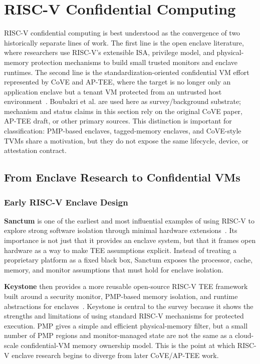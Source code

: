 \section{RISC-V Confidential Computing}

RISC-V confidential computing is best understood as the convergence of two
historically separate lines of work. The first line is the open enclave
literature, where researchers use RISC-V's extensible ISA, privilege model, and
physical-memory protection mechanisms to build small trusted monitors and
enclave runtimes. The second line is the standardization-oriented confidential
VM effort represented by CoVE and AP-TEE, where the target is no longer only an
application enclave but a tenant VM protected from an untrusted host
environment~\cite{sahita2023cove,riscv_ap_tee_2024,boubakri2025riscvtee}.
Boubakri et al. are used here as survey/background substrate; mechanism and
status claims in this section rely on the original CoVE paper, AP-TEE draft, or
other primary sources. This distinction is important for classification:
PMP-based enclaves, tagged-memory enclaves, and CoVE-style TVMs share a
motivation, but they do not expose the same lifecycle, device, or attestation
contract.

\subsection{From Enclave Research to Confidential VMs}

\subsubsection{Early RISC-V Enclave Design}

\textbf{Sanctum} is one of the earliest and most influential examples of using
RISC-V to explore strong software isolation through minimal hardware
extensions~\cite{costan2016sanctum}. Its importance is not just that it provides
an enclave system, but that it frames open hardware as a way to make TEE
assumptions explicit. Instead of treating a proprietary platform as a fixed
black box, Sanctum exposes the processor, cache, memory, and monitor assumptions
that must hold for enclave isolation.

\textbf{Keystone} then provides a more reusable open-source RISC-V TEE
framework built around a security monitor, PMP-based memory isolation, and
runtime abstractions for enclaves~\cite{lee2020keystone}. Keystone is central to
the survey because it shows the strengths and limitations of using standard
RISC-V mechanisms for protected execution. PMP gives a simple and efficient
physical-memory filter, but a small number of PMP regions and monitor-managed
state are not the same as a cloud-scale confidential-VM memory ownership model.
This is the point at which RISC-V enclave research begins to diverge from
later CoVE/AP-TEE work.

